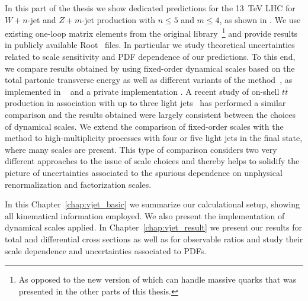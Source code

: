 In this part of the thesis we show dedicated
predictions for the 13~TeV LHC for $W+n$-jet and $Z+m$-jet production with
$n\leq 5$ and \mbox{$m\leq 4$}, as shown in \cite{Anger:2017nkq}. We use existing one-loop matrix elements from the original \BlackHat{} library~\cite{Berger:2008sj}\footnote{As opposed to the
new version of \BlackHat{} \cite{wbbpaper} which can handle massive quarks that was presented in the other parts of this thesis.} and provide results in publicly available Root~\cite{ROOT} \ntuple{} files. In particular we study theoretical uncertainties related to scale sensitivity and PDF
dependence of our predictions. To this end, we compare results obtained by using fixed-order dynamical
scales based on the total partonic transverse energy
as well as different variants of the \MINLO{} method~\cite{MINLO}, as implemented in \SHERPA{}~\cite{Sherpa} and a private implementation \cite{danielminlo}. A recent study of on-shell $t\bar t$ production in association with up to three light jets~\cite{ttjjj} has performed a similar comparison and the results obtained were largely consistent between the choices of dynamical scales. We extend the comparison of fixed-order scales
with the \MINLO{} method to high-multiplicity processes with four or
five light jets in the final state, where many scales are present. This type of comparison considers two very different approaches to the issue of scale choices and thereby helps to solidify the picture of uncertainties associated to the spurious dependence on unphysical renormalization and factorization scales.


In this Chapter~\ref{chap:vjet_basic} we summarize our
calculational setup, showing all kinematical information employed. We also present the implementation of dynamical
scales applied. In Chapter~\ref{chap:vjet_result} we present our results for total and
differential cross sections as well as for observable ratios and study their scale dependence and uncertainties
associated to PDFs.


